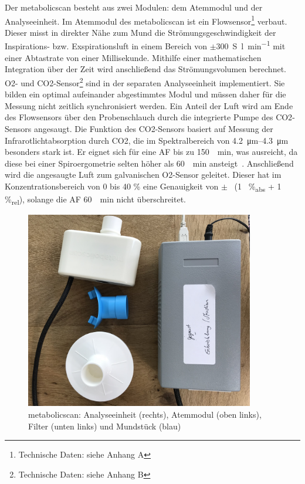 Der metabolicscan besteht aus zwei Modulen: dem Atemmodul und der Analyseeinheit. Im Atemmodul des metabolicscan ist ein Flowsensor\footnote{Technische Daten: siehe Anhang A} verbaut. Dieser misst in direkter Nähe zum Mund die Strömungsgeschwindigkeit der Inspirations- bzw. Exspirationsluft in einem Bereich von $\pm$\SI{300}{S\litre\per\minute} mit einer Abtastrate von einer Millisekunde. Mithilfe einer mathematischen Integration über der Zeit wird anschließend das Strömungsvolumen berechnet. \acs{O2}- und \acs{CO2}-Sensor\footnote{Technische Daten: siehe Anhang B} sind in der separaten Analyseeinheit implementiert. Sie bilden ein optimal aufeinander abgestimmtes Modul und müssen daher für die Messung nicht zeitlich synchronisiert werden. Ein Anteil der Luft wird am Ende des Flowsensors über den Probenschlauch durch die integrierte Pumpe des \acs{CO2}-Sensors angesaugt. Die Funktion des \acs{CO2}-Sensors basiert auf Messung der Infrarotlichtabsorption durch \acs{CO2}, die im Spektralbereich von \SIrange{4,2}{4,3}{\micro\metre} besonders stark ist. Er eignet sich für eine \ac{AF} bis zu \SI{150}{\per\minute}, was ausreicht, da diese bei einer Spiroergometrie selten höher als \SI{60}{\per\minute} ansteigt~\cite{Hollmann.2006}. Anschließend wird die angesaugte Luft zum galvanischen \acs{O2}-Sensor geleitet. Dieser hat im Konzentrationsbereich von 0 bis 40 \% eine Genauigkeit von $\pm$~ (1~ \%\textsubscript{abs} + 1 \%\textsubscript{rel}), solange die \acs{AF} \SI{60}{\per\minute} nicht überschreitet.

\begin{figure}[H]
	\centering
	\includegraphics[width=100mm]{Bilder/mbs.jpg}
	\caption[metabolicscan: Analyseeinheit, Atemmodul, Filter und Mundstück]{metabolicscan: Analyseeinheit (rechts), Atemmodul (oben links), Filter (unten links) und Mundstück (blau)}
	\label{pic:pic9}
\end{figure}

